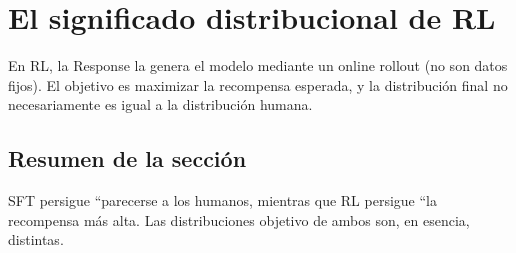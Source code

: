 \section{El significado distribucional de RL}
En RL, la Response la genera el modelo mediante un online rollout (no son datos fijos). El objetivo es maximizar la recompensa esperada, y la distribución final no necesariamente es igual a la distribución humana.

\subsection{Resumen de la sección}
SFT persigue ``parecerse a los humanos, mientras que RL persigue ``la recompensa más alta. Las distribuciones objetivo de ambos son, en esencia, distintas.

\newpage
